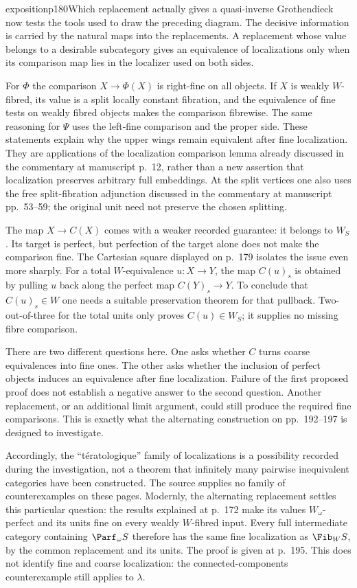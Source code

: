 \begin{dcomment}{exposition}{p180}{Which replacement actually gives a quasi-inverse}
Grothendieck now tests the tools used to draw the preceding diagram. The decisive information is carried by the natural maps into the replacements. A replacement whose value belongs to a desirable subcategory gives an equivalence of localizations only when its comparison map lies in the localizer used on both sides.

For $\Phi$ the comparison $X\to\Phi(X)$ is right-fine on all objects. If $X$ is weakly $W$-fibred, its value is a split locally constant fibration, and the equivalence of fine tests on weakly fibred objects makes the comparison fibrewise. The same reasoning for $\Psi$ uses the left-fine comparison and the proper side. These statements explain why the upper wings remain equivalent after fine localization. They are applications of the localization comparison lemma already discussed in the commentary at manuscript p.~12, rather than a new assertion that localization preserves arbitrary full embeddings. At the split vertices one also uses the free split-fibration adjunction discussed in the commentary at manuscript pp.~53--59; the original unit need not preserve the chosen splitting.

The map $X\to C(X)$ comes with a weaker recorded guarantee: it belongs to $W_S$. Its target is perfect, but perfection of the target alone does not make the comparison fine. The Cartesian square displayed on p.~179 isolates the issue even more sharply. For a total $W$-equivalence $u:X\to Y$, the map $C(u)_s$ is obtained by pulling $u$ back along the perfect map $C(Y)_s\to Y$. To conclude that $C(u)_s\in W$ one needs a suitable preservation theorem for that pullback. Two-out-of-three for the total units only proves $C(u)\in W_S$; it supplies no missing fibre comparison.

There are two different questions here. One asks whether $C$ turns coarse equivalences into fine ones. The other asks whether the inclusion of perfect objects induces an equivalence after fine localization. Failure of the first proposed proof does not establish a negative answer to the second question. Another replacement, or an additional limit argument, could still produce the required fine comparisons. This is exactly what the alternating construction on pp.~192--197 is designed to investigate.

Accordingly, the ``t\'eratologique'' family of localizations is a possibility recorded during the investigation, not a theorem that infinitely many pairwise inequivalent categories have been constructed. The source supplies no family of counterexamples on these pages. Modernly, the alternating replacement settles this particular question: the results explained at p.~172 make its values $W_\omega$-perfect and its units fine on every weakly $W$-fibred input. Every full intermediate category containing $\Parf_\omega S$ therefore has the same fine localization as $\Fib_W S$, by the common replacement and its units. The proof is given at p.~195. This does not identify fine and coarse localization: the connected-components counterexample still applies to $\lambda$.
\end{dcomment}


